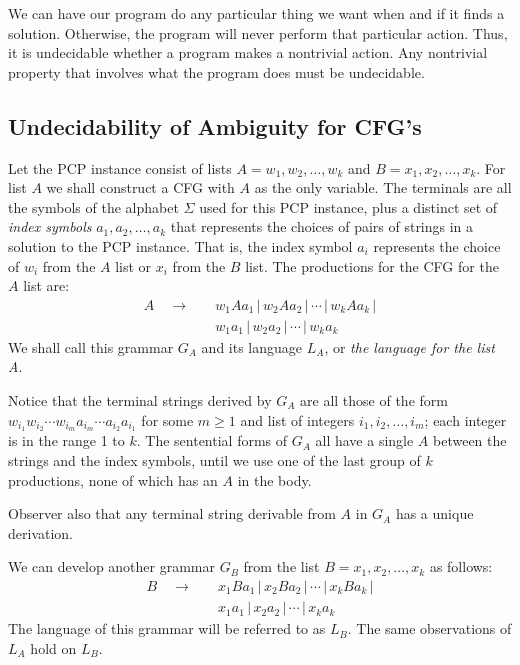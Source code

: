 \documentclass[]{article}
\begin{document}
We can have our program do any particular thing we want when and if it finds a
solution. Otherwise, the program will never perform that particular action.
Thus, it is undecidable whether a program makes a nontrivial action. Any
nontrivial property that involves what the program does must be undecidable.

\subsection*{Undecidability of Ambiguity for CFG's}
Let the PCP instance consist of lists $A = w_1,w_2,\ldots,w_k$ and $B =
x_1,x_2,\ldots,x_k$. For list $A$ we shall construct a CFG with $A$ as the only
variable. The terminals are all the symbols of the alphabet $\Sigma$ used for
this PCP instance, plus a distinct set of \emph{index symbols}
$a_1,a_2,\ldots,a_k$ that represents the choices of pairs of strings in a
solution to the PCP instance. That is, the index symbol $a_i$ represents the
choice of $w_i$ from the $A$ list or $x_i$ from the $B$ list. The productions
for the CFG for the $A$ list are:
\begin{align*}
A \quad \rightarrow \quad & w_1Aa_1\,|\,w_2Aa_2\,|\,\cdots\,|\,w_kAa_k\,| \\
                          & w_1a_1 \,|\,w_2a_2 \,|\,\cdots\,|\,w_ka_k
\end{align*}
We shall call this grammar $G_A$ and its language $L_A$, or \emph{the language
for the list A}.

Notice that the terminal strings derived by $G_A$ are all those of the form
$w_{i_1}w_{i_2}\cdots w_{i_m}a_{i_m}\cdots{a_{i_2}}a_{i_1}$ for some $m \geq 1$
and list of integers $i_1,i_2,\ldots,i_m$; each integer is in the range 1 to
$k$. The sentential forms of $G_A$ all have a single $A$ between the strings and
the index symbols, until we use one of the last group of $k$ productions, none
of which has an $A$ in the body.

Observer also that any terminal string derivable from $A$ in $G_A$ has a unique
derivation.

We can develop another grammar $G_B$ from the list $B = x_1,x_2,\ldots,x_k$ as
follows:
\begin{align*}
B \quad \rightarrow \quad & x_1Ba_1\,|\,x_2Ba_2\,|\,\cdots\,|\,x_kBa_k\,| \\
                          & x_1a_1 \,|\,x_2a_2 \,|\,\cdots\,|\,x_ka_k
\end{align*}
The language of this grammar will be referred to as $L_B$. The same observations
of $L_A$ hold on $L_B$.
\end{document}

